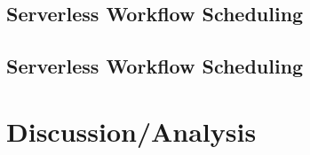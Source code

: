 \subsection{Serverless Workflow Scheduling}

\subsection{Serverless Workflow Scheduling}

\section{Discussion/Analysis}
